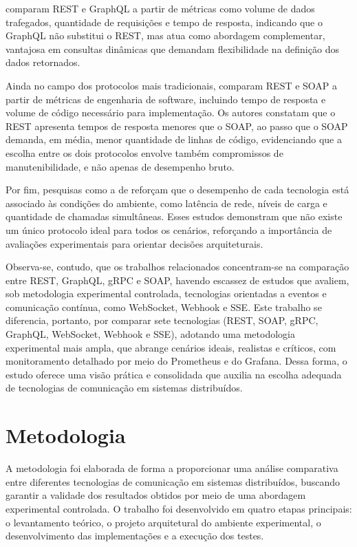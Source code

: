 \documentclass[a4paper,12pt]{article}
\begin{document}
 comparam REST e GraphQL a partir de métricas como volume de dados trafegados, quantidade de requisições e tempo de resposta, indicando que o GraphQL não substitui o REST, mas atua como abordagem complementar, vantajosa em consultas dinâmicas que demandam flexibilidade na definição dos dados retornados.

Ainda no campo dos protocolos mais tradicionais,  comparam REST e SOAP a partir de métricas de engenharia de software, incluindo tempo de resposta e volume de código necessário para implementação. Os autores constatam que o REST apresenta tempos de resposta menores que o SOAP, ao passo que o SOAP demanda, em média, menor quantidade de linhas de código, evidenciando que a escolha entre os dois protocolos envolve também compromissos de manutenibilidade, e não apenas de desempenho bruto.

Por fim, pesquisas como a de  reforçam que o desempenho de cada tecnologia está associado às condições do ambiente, como latência de rede, níveis de carga e quantidade de chamadas simultâneas. Esses estudos demonstram que não existe um único protocolo ideal para todos os cenários, reforçando a importância de avaliações experimentais para orientar decisões arquiteturais.

Observa-se, contudo, que os trabalhos relacionados concentram-se na comparação entre REST, GraphQL, gRPC e SOAP, havendo escassez de estudos que avaliem, sob metodologia experimental controlada, tecnologias orientadas a eventos e comunicação contínua, como WebSocket, Webhook e SSE. Este trabalho se diferencia, portanto, por comparar sete tecnologias (REST, SOAP, gRPC, GraphQL, WebSocket, Webhook e SSE), adotando uma metodologia experimental mais ampla, que abrange cenários ideais, realistas e críticos, com monitoramento detalhado por meio do Prometheus e do Grafana. Dessa forma, o estudo oferece uma visão prática e consolidada que auxilia na escolha adequada de tecnologias de comunicação em sistemas distribuídos.

\section{Metodologia}

A metodologia foi elaborada de forma a proporcionar uma análise comparativa entre diferentes tecnologias de comunicação em sistemas distribuídos, buscando garantir a validade dos resultados obtidos por meio de uma abordagem experimental controlada. O trabalho foi desenvolvido em quatro etapas principais: o levantamento teórico, o projeto arquitetural do ambiente experimental, o desenvolvimento das implementações e a execução dos testes.
\end{document}
